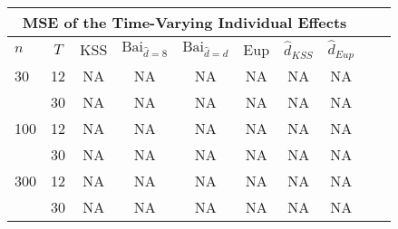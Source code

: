 \begin{tabular}{lccccccccc} 
\hline \multicolumn{8}{c}{MSE of the Time-Varying Individual Effects} \\ \hline 
$n$ & $T$ & KSS & $ \text{Bai}_{\hat{d} = 8}$ & $\text{Bai}_{\hat{d} = d}$ & Eup & $\hat{d}_{KSS}$ & $\hat{d}_{Eup}$ \\
\hline
30 & 12 &  NA  &  NA  &  NA  &  NA  &  NA  &  NA  \\
& 30 &  NA  &  NA  &  NA  &  NA  &  NA  &  NA  \\
100 & 12 &  NA  &  NA  &  NA  &  NA  &  NA  &  NA  \\
& 30 &  NA  &  NA  &  NA  &  NA  &  NA  &  NA  \\
300 & 12 &  NA  &  NA  &  NA  &  NA  &  NA  &  NA  \\
& 30 &  NA  &  NA  &  NA  &  NA  &  NA  &  NA  \\
\end{tabular} 
